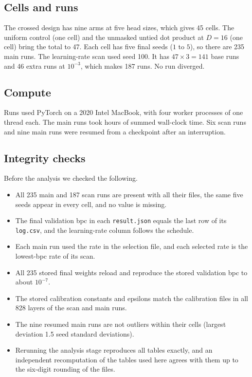 \documentclass[11pt]{article}
\begin{document}
\subsection{Cells and runs}

The crossed design has nine arms at five head sizes, which gives 45 cells.
The uniform control (one cell) and the unmasked untied dot product at $D=16$ (one cell) bring the total to 47.
Each cell has five final seeds ($1$ to $5$), so there are 235 main runs.
The learning-rate scan used seed 100.
It has $47\times3=141$ base runs and 46 extra runs at $10^{-3}$, which makes 187 runs.
No run diverged.

\subsection{Compute}

Runs used PyTorch \citep{paszke2019} on a 2020 Intel MacBook, with four worker processes of one thread each.
The main runs took \totalHoursMain{} hours of summed wall-clock time.
Six scan runs and nine main runs were resumed from a checkpoint after an interruption.

\subsection{Integrity checks}

Before the analysis we checked the following.
\begin{itemize}
\item All 235 main and 187 scan runs are present with all their files, the same five seeds appear in every cell, and no value is missing.
\item The final validation bpc in each \texttt{result.json} equals the last row of its \texttt{log.csv}, and the learning-rate column follows the schedule.
\item Each main run used the rate in the selection file, and each selected rate is the lowest-bpc rate of its scan.
\item All 235 stored final weights reload and reproduce the stored validation bpc to about $10^{-7}$.
\item The stored calibration constants and epsilons match the calibration files in all 828 layers of the scan and main runs.
\item The nine resumed main runs are not outliers within their cells (largest deviation 1.5 seed standard deviations).
\item Rerunning the analysis stage reproduces all tables exactly, and an independent recomputation of the tables used here agrees with them up to the six-digit rounding of the files.
\end{itemize}
\end{document}
